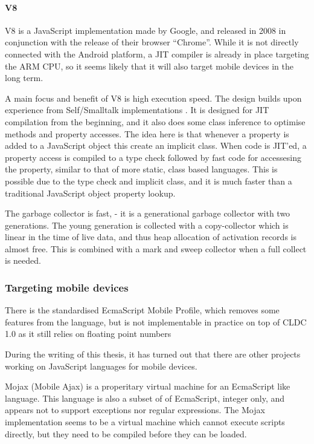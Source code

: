 \documentclass[11pt]{report}
\begin{document}
\paragraph{V8} V8 \cite{v8} is a JavaScript implementation made by Google, and released in 2008 in conjunction with the release of their browser ``Chrome''. 
While it is not directly connected with the Android platform, a JIT compiler is already in place targeting the ARM CPU, so it seems likely that it will also target mobile devices in the long term.

A main focus and benefit of V8 is high execution speed.
The design builds upon experience from Self/Smalltalk implementations \cite{articles-before-v8}.
It is designed for JIT compilation from the beginning, and it also does some class inference to optimise methods and property accesses.
The idea here is that whenever a property is added to a JavaScript object this create an implicit class. When code is JIT'ed, a property access is compiled to a type check followed by fast code for accessesing the property, similar to that of more static, class based languages. This is possible due to the type check and implicit class, and it is much faster than a traditional JavaScript object property lookup.

The garbage collector is fast, - it is a generational garbage collector with two generations. The young generation is collected with a copy-collector which is linear in the time of live data, and thus heap allocation of activation records is almost free. 
This is combined with a mark and sweep collector when a full collect is needed.

\subsubsection{Targeting mobile devices}

There is the standardised EcmaScript Mobile Profile, which removes some features from the language, but is not implementable in practice on top of CLDC 1.0 as it still relies on floating point numbers

During the writing of this thesis, it has turned out that there are other projects working on JavaScript languages for mobile devices.

Mojax (Mobile Ajax) \cite{mojax} is a properitary virtual machine for an EcmaScript like language. This language is also a subset of of EcmaScript, integer only, and appears not to support exceptions nor regular expressions.
The Mojax implementation seems to be a virtual machine which cannot execute scripts directly, but they need to be compiled before they can be loaded.
\end{document}
